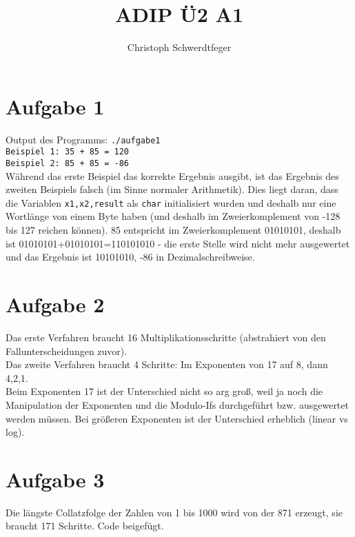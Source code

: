 \documentclass[10pt]{article} %
\title{ ADIP Ü2 A1 }
\author{Christoph Schwerdtfeger}
\numberwithin{equation}{section}
\begin{document}
\maketitle
\section{Aufgabe 1}
Output des Programms:
\texttt{./aufgabe1 \\
Beispiel 1: 35 + 85 = 120\\
Beispiel 2: 85 + 85 = -86\\
}
Während das erste Beispiel das korrekte Ergebnis ausgibt, ist das Ergebnis des zweiten Beispiels falsch (im Sinne normaler Arithmetik). Dies liegt daran, dass die Variablen \texttt{x1,x2,result} als \texttt{char} initialisiert wurden und deshalb nur eine Wortlänge von einem Byte haben (und deshalb im Zweierkomplement von -128 bis 127 reichen können). 85 entspricht im Zweierkomplement 01010101, deshalb ist 01010101+01010101=110101010 - die erste Stelle wird nicht mehr ausgewertet und das Ergebnis ist 10101010, -86 in Dezimalschreibweise.
\section{Aufgabe 2}
Das erste Verfahren braucht 16 Multiplikationsschritte (abstrahiert von den Fallunterscheidungen zuvor).
\\Das zweite Verfahren braucht 4 Schritte: Im Exponenten von 17 auf 8, dann 4,2,1.\\
Beim Exponenten 17 ist der Unterschied nicht so arg groß, weil ja noch die Manipulation der Exponenten und die Modulo-Ifs durchgeführt bzw. ausgewertet werden müssen. Bei größeren Exponenten ist der Unterschied erheblich (linear vs log).

\section{Aufgabe 3}
Die längste Collatzfolge der Zahlen von 1 bis 1000 wird von der 871 erzeugt, sie braucht 171 Schritte. Code beigefügt.
\end{document}
